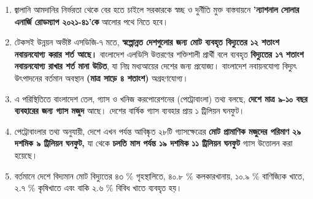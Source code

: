 \documentclass[11pt]{article}
\begin{document}
\begin{enumerate}
{সৌর স্থাপনা মডেলে এই সক্ষমতা ৩০ হাজার মেগাওয়াটে পৌঁছানো সম্ভব।}
\item জ্বালানি আমদানির নির্ভরতা থেকে বের হতে চাইলে সরকারকে স্বচ্ছ ও দুর্নীতি মুক্ত বাস্তবায়নে \textbf{'ন্যাশনাল সোলার এনার্জি রোডম্যাপ ২০২১-৪১'কে}
আলোর পথে নিতে হবে।
\item টেকসই উন্নয়ন অভীষ্ট এসডিজি-৭ মতে, \textbf{স্বল্পোন্নত দেশগুলোর জন্য মোট ব্যবহৃত বিদ্যুতের ১২ শতাংশ নবায়নযোগ্য করার শর্ত আছে।}
বাংলাদেশ এলডিসি উত্তরণের শক্তিশালী প্রার্থী বলে ব্যবহৃত \textbf{বিদ্যুতের ১৭ শতাংশ নবায়নযোগ্য রাখার শর্ত মানা উচিত}, যা নিম্ন মধ্যআয়ের
দেশের জন্য প্রযোজ্য। বাংলাদেশ নবায়নযোগ্য বিদ্যুৎ উৎপাদনের বর্তমান অবস্থান \textbf{(মাত্র সাড়ে ৪ শতাংশ)} অগ্রহণযোগ্য।
\item এ পরিস্থিতিতে বাংলাদেশ তেল, গ্যাস ও খনিজ করপোরেশনের (পেট্রোবাংলা) তথ্য বলছে, \textbf{দেশে মাত্র ৯-১০ বছর ব্যবহারের জন্য গ্যাস মজুদ} আছে।
দেশের বার্ষিক গ্যাস ব্যবহার প্রায় ১ ট্রিলিয়ন ঘনফুট।
\item পেট্রোবাংলার তথ্য অনুযায়ী, দেশে এখন পর্যন্ত আবিষ্কৃত ২৮টি গ্যাসক্ষেত্রের \textbf{মোট প্রামাণিক মজুদের পরিমাণ ২৯ দশমিক ৯ ট্রিলিয়ন ঘনফুট,}
যা থেকে \textbf{চলতি মাস পর্যন্ত ১৯ দশমিক ১১ ট্রিলিয়ন ঘনফুট} গ্যাস উত্তোলন করা হয়েছে।
\item বর্তমানে দেশে বিদ্যমান মোট বিদ্যুতের ৪৩ \% গৃহস্থালিতে, ৪০.৮ \% কলকারখানায়, ১০.৯ \% বাণিজ্যিক খাতে,
২.৭ \% কৃষিখাতে এবং বাকি ২.৬ \% বিবিধ খাতে ব্যবহৃত হয়।
\end{enumerate}
\end{document}
